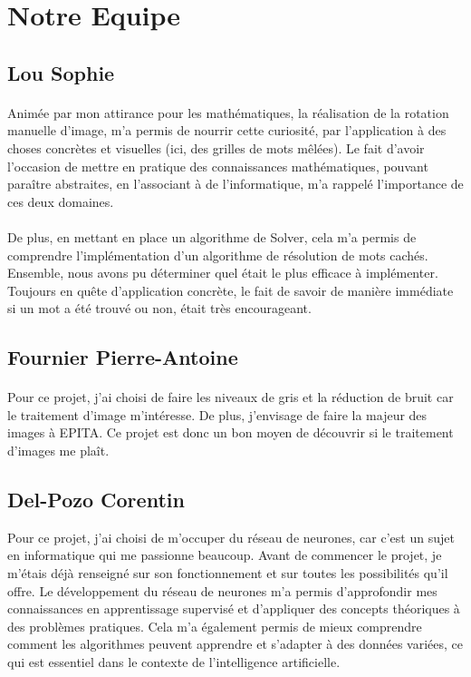 \documentclass{article}
\begin{document}
\section{Notre Equipe}
\subsection{Lou Sophie}
\paragraph{}
Animée par mon attirance pour les mathématiques, la réalisation de la rotation manuelle d’image, m’a permis de nourrir cette curiosité, par l’application à des choses concrètes et visuelles (ici, des grilles de mots mêlées). Le fait d’avoir l’occasion de mettre en pratique des connaissances mathématiques, pouvant paraître abstraites, en l’associant à de l’informatique, m’a rappelé l’importance de ces deux domaines.
\paragraph{}
De plus, en mettant en place un algorithme de Solver, cela m’a permis de comprendre l’implémentation d’un algorithme de résolution de mots cachés. 
Ensemble, nous avons pu déterminer quel était le plus efficace à implémenter.
Toujours en quête d’application concrète, le fait de savoir de manière immédiate si un mot a été trouvé ou non, était très encourageant.
\newpage
\subsection{Fournier Pierre-Antoine}
\paragraph{}
Pour ce projet, j’ai choisi de faire les niveaux de gris et la réduction de bruit car le traitement d’image m’intéresse. De plus, j'envisage de faire la majeur des images à EPITA. Ce projet est donc un bon moyen de découvrir si le traitement d'images me plaît. 
\subsection{Del-Pozo Corentin}

Pour ce projet, j'ai choisi de m'occuper du réseau de neurones, car c'est un sujet en informatique qui me passionne beaucoup. Avant de commencer le projet, je m'étais déjà renseigné sur son fonctionnement et sur toutes les possibilités qu'il offre. Le développement du réseau de neurones m'a permis d'approfondir mes connaissances en apprentissage supervisé et d'appliquer des concepts théoriques à des problèmes pratiques. Cela m'a également permis de mieux comprendre comment les algorithmes peuvent apprendre et s'adapter à des données variées, ce qui est essentiel dans le contexte de l'intelligence artificielle.
\\
\end{document}
